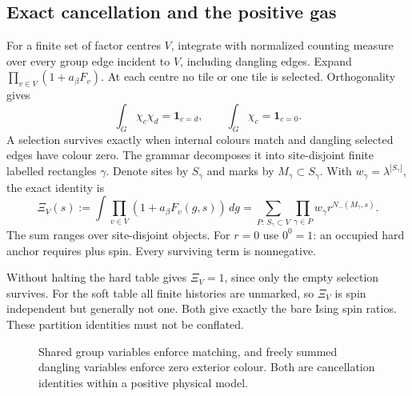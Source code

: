 \documentclass[11pt,reqno]{amsart}
\numberwithin{equation}{section}
\theoremstyle{definition}
\theoremstyle{remark}
\newcommand{\one}{\mathbf1}
\begin{document}
\subsection{Exact cancellation and the positive gas}\label{sec:fourier}
For a finite set of factor centres $V$, integrate with normalized counting measure over every group edge incident to $V$, including dangling edges. Expand $\prod_{v\in V}(1+a_\beta F_v)$. At each centre no tile or one tile is selected. Orthogonality gives
\begin{equation}\label{eq:orthogonality}
 \int_G\chi_c\chi_d=\one_{c=d},\qquad \int_G\chi_c=\one_{c=0}.
\end{equation}
A selection survives exactly when internal colours match and dangling selected edges have colour zero. The grammar decomposes it into site-disjoint finite labelled rectangles $\gamma$. Denote sites by $S_\gamma$ and marks by $M_\gamma\subset S_\gamma$. With $w_\gamma=\lambda^{|S_\gamma|}$, the exact identity is
\begin{equation}\label{eq:gas}
 \Xi_V(s):=\int\prod_{v\in V}(1+a_\beta F_v(g,s))\,dg
 =\sum_{P:\,S_\gamma\subset V}\prod_{\gamma\in P}w_\gamma r^{N_-(M_\gamma,s)}.
\end{equation}
The sum ranges over site-disjoint objects. For $r=0$ use $0^0=1$: an occupied hard anchor requires plus spin. Every surviving term is nonnegative.

Without halting the hard table gives $\Xi_V=1$, since only the empty selection survives. For the soft table all finite histories are unmarked, so $\Xi_V$ is spin independent but generally not one. Both give exactly the bare Ising spin ratios. These partition identities must not be conflated.

\begin{figure}[ht]
\centering
{}
\caption{Shared group variables enforce matching, and freely summed dangling variables enforce zero exterior colour. Both are cancellation identities within a positive physical model.}
\label{fig:orthogonality}
\end{figure}
\end{document}
